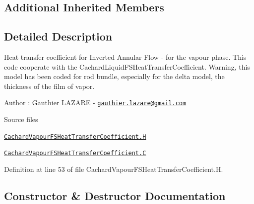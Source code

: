 \subsection*{Additional Inherited Members}


\subsection{Detailed Description}
Heat transfer coefficient for Inverted Annular Flow -\/ for the vapour phase. This code cooperate with the Cachard\+Liquid\+F\+S\+Heat\+Transfer\+Coefficient. Warning, this model has been coded for rod bundle, especially for the delta model, the thickness of the film of vapor. 

\label{_Description}%
 Author \+: Gauthier L\+A\+Z\+A\+RE -\/ \href{mailto:gauthier.lazare@gmail.com}{\tt gauthier.\+lazare@gmail.\+com}

\begin{DoxyParagraph}{Source files}

\begin{DoxyItemize}
\item \href{../../../home/carlo/data/GeN-Foam/GeN-Foam_ffn/GeN-Foam/GeN-Foam/classes/thermalHydraulics/src/physicsModels/heatTransferModels/FSHeatTransferCoefficientModels/subModels/postCHFModels/CachardVapour/CachardVapourFSHeatTransferCoefficient.H}{\tt Cachard\+Vapour\+F\+S\+Heat\+Transfer\+Coefficient.\+H} 
\item \href{../../../home/carlo/data/GeN-Foam/GeN-Foam_ffn/GeN-Foam/GeN-Foam/classes/thermalHydraulics/src/physicsModels/heatTransferModels/FSHeatTransferCoefficientModels/subModels/postCHFModels/CachardVapour/CachardVapourFSHeatTransferCoefficient.C}{\tt Cachard\+Vapour\+F\+S\+Heat\+Transfer\+Coefficient.\+C} 
\end{DoxyItemize}
\end{DoxyParagraph}


Definition at line 53 of file Cachard\+Vapour\+F\+S\+Heat\+Transfer\+Coefficient.\+H.



\subsection{Constructor \& Destructor Documentation}
\mbox{\label{classFoam_1_1FSHeatTransferCoefficientModels_1_1CachardVapour_a77199a996b93df701ed9967756bb420a}} 
